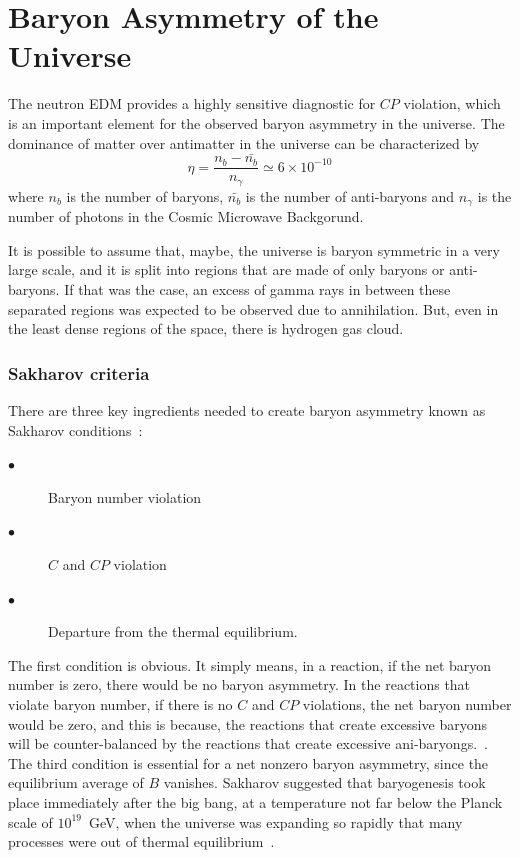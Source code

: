 \section{Baryon Asymmetry of the Universe}
The neutron EDM provides a highly sensitive diagnostic for $CP$
violation, which is an important element for the observed
baryon asymmetry in the universe.  The dominance of matter over
antimatter in the universe can be characterized by~\cite{Cline}
\begin{equation}
\eta = \frac{n_b-\bar{n_b}}{n_{\gamma}} \simeq 6 \times 10^{-10}
\end{equation}
where $n_b$ is the number of baryons, $\bar{n_b}$ is the number of
anti-baryons and $n_{\gamma}$ is the number of photons in the Cosmic
Microwave Backgorund.

It is possible to assume that, maybe, the universe is baryon symmetric
in a very large scale, and it is split into regions that are made of
only baryons or anti-baryons. If that was the case, an excess of gamma
rays in between these separated regions was expected to be observed
due to annihilation. But, even in the least dense regions of the
space, there is hydrogen gas cloud.

\subsubsection{Sakharov criteria}
There are three key ingredients needed to
create baryon asymmetry known as Sakharov conditions~\cite{Sakharov:1967dj}:
\begin{center}
\begin{description}
\item[$\bullet$]Baryon number violation
\item[$\bullet$] $C$ and $CP$ violation
\item[$\bullet$] Departure from the thermal equilibrium.
\end{description}
\end{center}

The first condition is obvious. It simply means, in a reaction, if the
net baryon number is zero, there would be no baryon asymmetry. In the
reactions that violate baryon number, if there is no $C$ and $CP$
violations, the net baryon number would be zero, and this is because,
the reactions that create excessive baryons will be counter-balanced
by the reactions that create excessive
ani-baryongs.~\cite{theearlyuniverse}. The third condition is
essential for a net nonzero baryon asymmetry, since the equilibrium
average of $B$ vanishes. Sakharov suggested that baryogenesis took
place immediately after the big bang, at a temperature not far below
the Planck scale of $10^{19}$~GeV, when the universe was expanding so
rapidly that many processes were out of thermal
equilibrium~\cite{cohen1993progress}.




